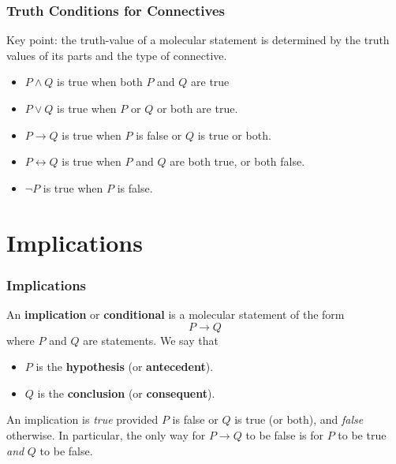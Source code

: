 \documentclass[11pt, compress]{beamer}
\newcommand{\terminology}[1]{\textbf{#1}}\newcommand{\lt}{<}
\renewcommand{\iff}{\leftrightarrow}
\newcommand{\imp}{\rightarrow}
\begin{document}
\begin{frame}
\frametitle{Truth Conditions for Connectives}
 Key point: the truth-value of a molecular statement is determined by the truth values of its parts and the type of connective.
\pause 

\begin{itemize}[<+->]
\item{} \(P \wedge Q\) is true when both \(P\) and \(Q\) are true

\item{} \(P \vee Q\) is true when \(P\) or \(Q\) or both are true.

\item{} \(P \imp Q\) is true when \(P\) is false or \(Q\) is true or both.

\item{} \(P \iff Q\) is true when \(P\) and \(Q\) are both true, or both false.

\item{} \(\neg P\) is true when \(P\) is false.
\end{itemize}

\end{frame}
 


\section{Implications}
\begin{frame}
\frametitle{Implications}
 An \terminology{implication} or \terminology{conditional} is a molecular statement of the form%
\begin{equation*}
P \imp Q
\end{equation*}
where \(P\) and \(Q\) are statements. We say that\begin{itemize}
\item{} \(P\) is the \terminology{hypothesis} (or \terminology{antecedent}).

\item{} \(Q\) is the \terminology{conclusion} (or \terminology{consequent}).
\end{itemize}

 An implication is \emph{true} provided \(P\) is false or \(Q\) is true (or both), and \emph{false} otherwise. In particular, the only way for \(P \imp Q\) to be false is for \(P\) to be true \emph{and} \(Q\) to be false.
\end{frame}
 
\end{document}
